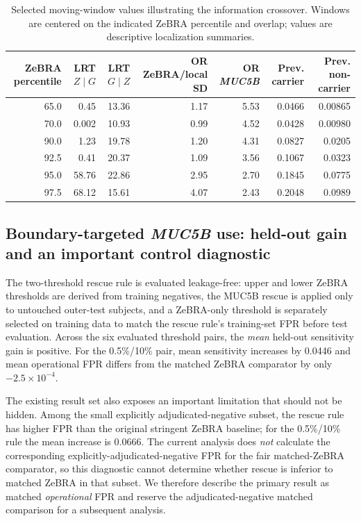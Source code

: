 {\begin{table}[!t]
\caption{Selected moving-window values illustrating the information crossover. Windows are centered on the indicated ZeBRA percentile and overlap; values are descriptive localization summaries.}
\label{tab:local-windows}\centering\scriptsize
\begin{tabular}{rrrrrrr}
\toprule
ZeBRA percentile & LRT $Z\mid G$ & LRT $G\mid Z$ & OR ZeBRA/local SD & OR \textit{MUC5B} & Prev. carrier & Prev. non-carrier\\
\midrule
65.0 & 0.45 & 13.36 & 1.17 & 5.53 & 0.0466 & 0.00865\\
70.0 & 0.002 & 10.93 & 0.99 & 4.52 & 0.0428 & 0.00980\\
90.0 & 1.23 & 19.78 & 1.20 & 4.31 & 0.0827 & 0.0205\\
92.5 & 0.41 & 20.37 & 1.09 & 3.56 & 0.1067 & 0.0323\\
95.0 & 58.76 & 22.86 & 2.95 & 2.70 & 0.1845 & 0.0775\\
97.5 & 68.12 & 15.61 & 4.07 & 2.43 & 0.2048 & 0.0989\\
\bottomrule
\end{tabular}
\end{table}

\subsection{Boundary-targeted \textit{MUC5B} use: held-out gain and an important control diagnostic}
The two-threshold rescue rule is evaluated leakage-free: upper and lower ZeBRA thresholds are derived from training negatives, the MUC5B rescue is applied only to untouched outer-test subjects, and a ZeBRA-only threshold is separately selected on training data to match the rescue rule's training-set FPR before test evaluation. Across the six evaluated threshold pairs, the \emph{mean} held-out sensitivity gain is positive. For the 0.5\%/10\% pair, mean sensitivity increases by 0.0446 and mean operational FPR differs from the matched ZeBRA comparator by only $-2.5\times10^{-4}$.

The existing result set also exposes an important limitation that should not be hidden. Among the small explicitly adjudicated-negative subset, the rescue rule has higher FPR than the original stringent ZeBRA baseline; for the 0.5\%/10\% rule the mean increase is 0.0666. The current analysis does \emph{not} calculate the corresponding explicitly-adjudicated-negative FPR for the fair matched-ZeBRA comparator, so this diagnostic cannot determine whether rescue is inferior to matched ZeBRA in that subset. We therefore describe the primary result as matched \emph{operational} FPR and reserve the adjudicated-negative matched comparison for a subsequent analysis.

}
